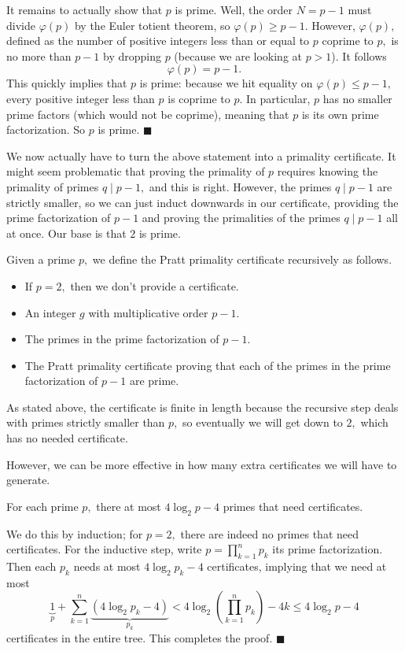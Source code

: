 It remains to actually show that $p$ is prime. Well, the order $N=p-1$ must divide $\varphi(p)$ by the Euler totient theorem, so $\varphi(p)\ge p-1.$ However, $\varphi(p),$ defined as the number of positive integers less than or equal to $p$ coprime to $p,$ is no more than $p-1$ by dropping $p$ (because we are looking at $p>1$). It follows
\[\varphi(p)=p-1.\]
This quickly implies that $p$ is prime: because we hit equality on $\varphi(p)\le p-1,$ every positive integer less than $p$ is coprime to $p.$ In particular, $p$ has no smaller prime factors (which would not be coprime), meaning that $p$ is its own prime factorization. So $p$ is prime. $\blacksquare$

We now actually have to turn the above statement into a primality certificate. It might seem problematic that proving the primality of $p$ requires knowing the primality of primes $q\mid p-1,$ and this is right. However, the primes $q\mid p-1$ are strictly smaller, so we can just induct downwards in our certificate, providing the prime factorization of $p-1$ and proving the primalities of the primes $q\mid p-1$ all at once. Our base is that $2$ is prime.
\begin{definition}
    Given a prime $p,$ we define the Pratt primality certificate recursively as follows.
    \begin{itemize}
        \item If $p=2,$ then we don't provide a certificate.
        \item An integer $g$ with multiplicative order $p-1.$
        \item The primes in the prime factorization of $p-1.$
        \item The Pratt primality certificate proving that each of the primes in the prime factorization of $p-1$ are prime.
    \end{itemize}
\end{definition}
As stated above, the certificate is finite in length because the recursive step deals with primes strictly smaller than $p,$ so eventually we will get down to $2,$ which has no needed certificate.

However, we can be more effective in how many extra certificates we will have to generate.
\begin{lemma}
    For each prime $p,$ there at most $4\log_2p-4$ primes that need certificates.
\end{lemma}
We do this by induction; for $p=2,$ there are indeed no primes that need certificates. For the inductive step, write $p=\prod_{k=1}^np_k$ its prime factorization. Then each $p_k$ needs at most $4\log_2p_k-4$ certificates, implying that we need at most
\[\underbrace1_p+\sum_{k=1}^n\underbrace{(4\log_2p_k-4)}_{p_k}<4\log_2\left(\prod_{k=1}^np_k\right)-4k\le4\log_2p-4\]
certificates in the entire tree. This completes the proof. $\blacksquare$

